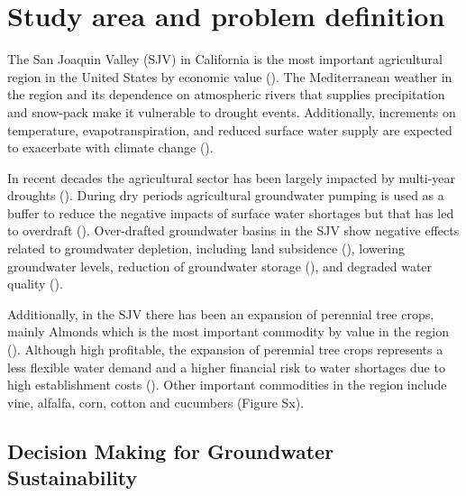 \documentclass[11pt,a4paper]{article}
\begin{document}
\section{Study area and problem definition}

The San Joaquin Valley (SJV) in California is the most important agricultural region in the United States by economic value (\cite{usda_national_2020}). The Mediterranean weather in the region and its dependence on atmospheric rivers that supplies precipitation and snow-pack make it vulnerable to drought events. Additionally, increments on temperature, evapotranspiration, and reduced surface water supply are expected to exacerbate with climate change (\cite{fernandez-bou_regional_2021}).

 In recent decades the agricultural sector has been largely impacted by multi-year droughts (\cite{lund_lessons_2018,medellin-azuara_economic_2022}).  During dry periods agricultural groundwater pumping is used as a buffer to reduce the negative impacts of surface water shortages but that has led to overdraft (\cite{liu_groundwater_2022}). Over-drafted groundwater basins in the SJV show negative effects related to groundwater depletion, including land subsidence (\cite{ojha_sustained_2018}), lowering groundwater levels, reduction of groundwater storage (\cite{alam_post-drought_2021}), and degraded water quality (\cite{levy_critical_2021}).  
 
 Additionally, in the SJV there has been an expansion of perennial tree crops, mainly Almonds which is the most important commodity by value  in the region (\cite{usda_national_2020}). Although high profitable, the expansion of perennial tree crops represents a less flexible water demand and a higher financial risk to water shortages due to high establishment costs (\cite{qin_flexibility_2019,mall_water_2019}). Other important commodities in the region include vine, alfalfa, corn, cotton and cucumbers (Figure Sx). 

\subsection{Decision Making for Groundwater Sustainability}
\end{document}
